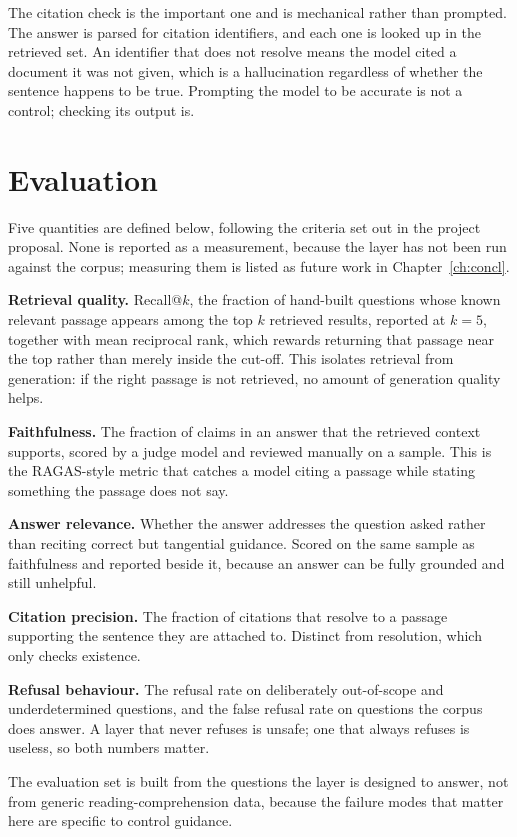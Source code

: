 \documentclass[10pt,openany]{report}
\begin{document}
The citation check is the important one and is mechanical rather than prompted. The answer is
parsed for citation identifiers, and each one is looked up in the retrieved set. An identifier that
does not resolve means the model cited a document it was not given, which is a hallucination
regardless of whether the sentence happens to be true. Prompting the model to be accurate is not a
control; checking its output is.

\section{Evaluation}

Five quantities are defined below, following the criteria set out in the project proposal. None is
reported as a measurement, because the layer has not been run against the corpus; measuring them is
listed as future work in Chapter~\ref{ch:concl}.

\textbf{Retrieval quality.} Recall@$k$, the fraction of hand-built questions whose known relevant
passage appears among the top $k$ retrieved results, reported at $k=5$, together with mean reciprocal
rank, which rewards returning that passage near the top rather than merely inside the cut-off. This
isolates retrieval from generation: if the right passage is not retrieved, no amount of generation
quality helps.

\textbf{Faithfulness.} The fraction of claims in an answer that the retrieved context supports,
scored by a judge model and reviewed manually on a sample. This is the RAGAS-style metric that catches
a model citing a passage while stating something the passage does not say.

\textbf{Answer relevance.} Whether the answer addresses the question asked rather than reciting
correct but tangential guidance. Scored on the same sample as faithfulness and reported beside it,
because an answer can be fully grounded and still unhelpful.

\textbf{Citation precision.} The fraction of citations that resolve to a passage supporting the
sentence they are attached to. Distinct from resolution, which only checks existence.

\textbf{Refusal behaviour.} The refusal rate on deliberately out-of-scope and underdetermined
questions, and the false refusal rate on questions the corpus does answer. A layer that never refuses
is unsafe; one that always refuses is useless, so both numbers matter.

The evaluation set is built from the questions the layer is designed to answer, not from generic
reading-comprehension data, because the failure modes that matter here are specific to control
guidance.
\end{document}
